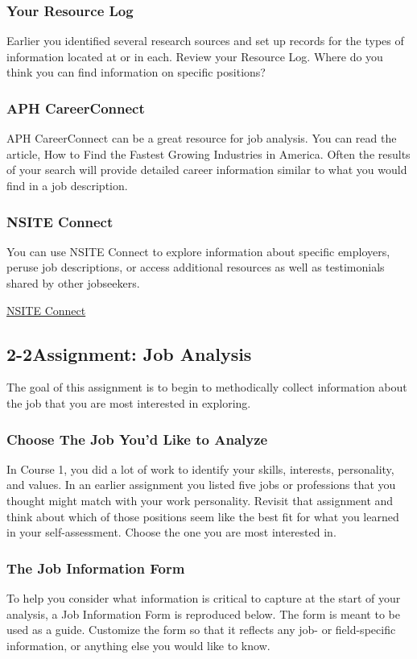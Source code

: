\subsubsection*{Your Resource Log}
Earlier you identified several research sources and set up records for the types of information located at or in each. Review your Resource Log. Where do you think you can find information on specific positions?
\subsubsection*{APH CareerConnect}
APH CareerConnect can be a great resource for job analysis. You can read the article, How to Find the Fastest Growing Industries in America. Often the results of your search will provide detailed career information similar to what you would find in a job description.
\subsubsection*{NSITE Connect}
You can use NSITE Connect to explore information about specific employers, peruse job descriptions, or access additional resources as well as testimonials shared by other jobseekers.

\href{https://nsite.org/job-board/}{NSITE Connect}

\pagebreak \subsection*{2-2\quad Assignment: Job Analysis}
The goal of this assignment is to begin to methodically collect information about the job that you are most interested in exploring.

\subsubsection*{Choose The Job You'd Like to Analyze}
In Course 1, you did a lot of work to identify your skills, interests, personality, and values. In an earlier assignment you listed five jobs or professions that you thought might match with your work personality.
Revisit that assignment and think about which of those positions seem like the best fit for what you learned in your self-assessment. Choose the one you are most interested in.
\subsubsection*{The Job Information Form}
To help you consider what information is critical to capture at the start of your analysis, a Job Information Form is reproduced below. The form is meant to be used as a guide. Customize the form so that it reflects any job- or field-specific information, or anything else you would like to know.

